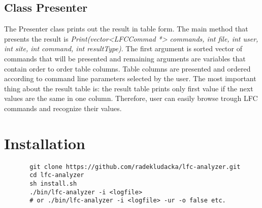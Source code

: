 \documentclass[a4paper, 11pt]{article} %
\begin{document}
\subsection{Class Presenter}
\label{c:presenter}

The Presenter class prints out the result in table form. The main method that presents the result is \textit{Print(vector<LFCCommad *> commands, int file, int user, int site, int command, int resultType)}. The first argument is sorted vector of commands that will be presented and remaining arguments are variables that contain order to order table columns. Table columns are presented and ordered according to command line parameters selected by the user. The most important thing about the result table is: the result table prints only first value if the next values are the same in one column. Therefore, user can easily browse trough LFC commands and recognize their values.


\section*{Installation}

    \begin{verbatim}
       git clone https://github.com/radekludacka/lfc-analyzer.git
       cd lfc-analyzer
       sh install.sh
       ./bin/lfc-analyzer -i <logfile>
       # or ./bin/lfc-analyzer -i <logfile> -ur -o false etc.
    \end{verbatim}







\end{document}
